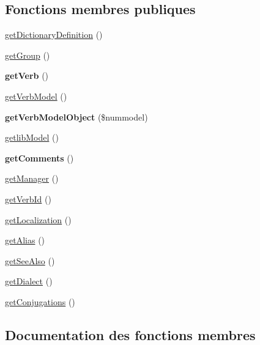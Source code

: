 \subsection*{Fonctions membres publiques}
\begin{DoxyCompactItemize}
\item 
\hyperlink{interfaceiConjugation_ab13cedc1b4f0d064a9bfff3cbfb63de6}{get\+Dictionary\+Definition} ()
\item 
\hyperlink{interfaceiConjugation_a21390064de33a77b99b26ec5a2e55351}{get\+Group} ()
\item 
\hypertarget{interfaceiConjugation_a5742a474f6114e172337a38ca2c8bae8}{}\label{interfaceiConjugation_a5742a474f6114e172337a38ca2c8bae8} 
{\bfseries get\+Verb} ()
\item 
\hyperlink{interfaceiConjugation_ab5482cc8f8e9f58dc852aff604813b6e}{get\+Verb\+Model} ()
\item 
\hypertarget{interfaceiConjugation_ab076acd6674f8effbf5306d6b92f3ad3}{}\label{interfaceiConjugation_ab076acd6674f8effbf5306d6b92f3ad3} 
{\bfseries get\+Verb\+Model\+Object} (\$nummodel)
\item 
\hyperlink{interfaceiConjugation_a2b6dd0a979a98bc50f6f9f7ec9b69e63}{getlib\+Model} ()
\item 
\hypertarget{interfaceiConjugation_ad887ef20e584040fe72f6e5a6212247e}{}\label{interfaceiConjugation_ad887ef20e584040fe72f6e5a6212247e} 
{\bfseries get\+Comments} ()
\item 
\hyperlink{interfaceiConjugation_a448829b47813a79d1f8ec65de91e8696}{get\+Manager} ()
\item 
\hyperlink{interfaceiConjugation_aa34e7af66125d28af4f485529d456a74}{get\+Verb\+Id} ()
\item 
\hyperlink{interfaceiConjugation_ab19ceb5ab295fd3d0f862d963379a7e2}{get\+Localization} ()
\item 
\hyperlink{interfaceiConjugation_a30a8959865d6b8d3f4ae69c31792f32a}{get\+Alias} ()
\item 
\hyperlink{interfaceiConjugation_a58e61c703ad1f0d76db1535235e530a0}{get\+See\+Also} ()
\item 
\hyperlink{interfaceiConjugation_a4e0b6c0923ecd596b6acff6c7b776f5f}{get\+Dialect} ()
\item 
\hyperlink{interfaceiConjugation_a6c0072d898eb8b2f3756c87dfed4af33}{get\+Conjugations} ()
\end{DoxyCompactItemize}


\subsection{Documentation des fonctions membres}
\hypertarget{interfaceiConjugation_a30a8959865d6b8d3f4ae69c31792f32a}{}\label{interfaceiConjugation_a30a8959865d6b8d3f4ae69c31792f32a} 
